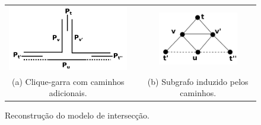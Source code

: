 
\begin{figure}[h]
  \centering
  \begin{tabular}{  c p{0.7cm} c}
    \includegraphics[width=5.5cm]{img/clawGrid} & &
    \includegraphics[width=3.5cm]{img/clawInduced.png}
    \\
    \footnotesize %
    (a)  \footnotesize Clique-garra com caminhos adicionais. && \footnotesize (b) Subgrafo induzido pelos caminhos.\\
  \end{tabular}

 \caption{Reconstrução do modelo de intersecção.}
 \label{fig:clawGrid}
\end{figure} 

 
